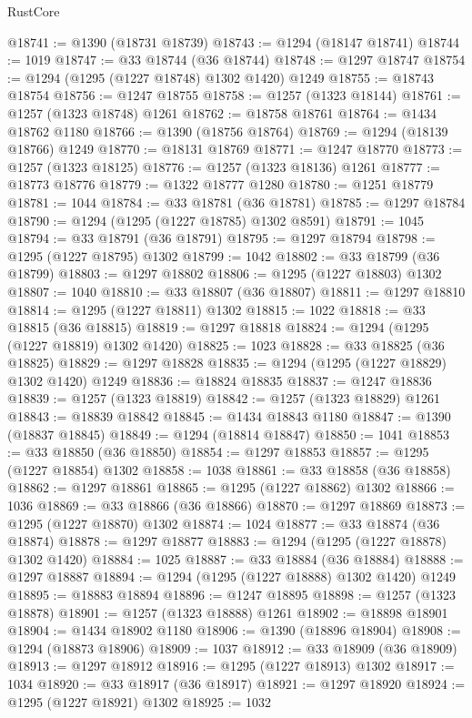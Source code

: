 \begin{lexlean}{RustCore}
\begin{coremodule}
@18741 := @1390 (@18731 @18739)
@18743 := @1294 (@18147 @18741)
@18744 := 1019
@18747 := @33 @18744 (@36 @18744)
@18748 := @1297 @18747
@18754 := @1294 (@1295 (@1227 @18748) @1302 @1420) @1249
@18755 := @18743 @18754
@18756 := @1247 @18755
@18758 := @1257 (@1323 @18144)
@18761 := @1257 (@1323 @18748) @1261
@18762 := @18758 @18761
@18764 := @1434 @18762 @1180
@18766 := @1390 (@18756 @18764)
@18769 := @1294 (@18139 @18766) @1249
@18770 := @18131 @18769
@18771 := @1247 @18770
@18773 := @1257 (@1323 @18125)
@18776 := @1257 (@1323 @18136) @1261
@18777 := @18773 @18776
@18779 := @1322 @18777 @1280
@18780 := @1251 @18779
@18781 := 1044
@18784 := @33 @18781 (@36 @18781)
@18785 := @1297 @18784
@18790 := @1294 (@1295 (@1227 @18785) @1302 @8591)
@18791 := 1045
@18794 := @33 @18791 (@36 @18791)
@18795 := @1297 @18794
@18798 := @1295 (@1227 @18795) @1302
@18799 := 1042
@18802 := @33 @18799 (@36 @18799)
@18803 := @1297 @18802
@18806 := @1295 (@1227 @18803) @1302
@18807 := 1040
@18810 := @33 @18807 (@36 @18807)
@18811 := @1297 @18810
@18814 := @1295 (@1227 @18811) @1302
@18815 := 1022
@18818 := @33 @18815 (@36 @18815)
@18819 := @1297 @18818
@18824 := @1294 (@1295 (@1227 @18819) @1302 @1420)
@18825 := 1023
@18828 := @33 @18825 (@36 @18825)
@18829 := @1297 @18828
@18835 := @1294 (@1295 (@1227 @18829) @1302 @1420) @1249
@18836 := @18824 @18835
@18837 := @1247 @18836
@18839 := @1257 (@1323 @18819)
@18842 := @1257 (@1323 @18829) @1261
@18843 := @18839 @18842
@18845 := @1434 @18843 @1180
@18847 := @1390 (@18837 @18845)
@18849 := @1294 (@18814 @18847)
@18850 := 1041
@18853 := @33 @18850 (@36 @18850)
@18854 := @1297 @18853
@18857 := @1295 (@1227 @18854) @1302
@18858 := 1038
@18861 := @33 @18858 (@36 @18858)
@18862 := @1297 @18861
@18865 := @1295 (@1227 @18862) @1302
@18866 := 1036
@18869 := @33 @18866 (@36 @18866)
@18870 := @1297 @18869
@18873 := @1295 (@1227 @18870) @1302
@18874 := 1024
@18877 := @33 @18874 (@36 @18874)
@18878 := @1297 @18877
@18883 := @1294 (@1295 (@1227 @18878) @1302 @1420)
@18884 := 1025
@18887 := @33 @18884 (@36 @18884)
@18888 := @1297 @18887
@18894 := @1294 (@1295 (@1227 @18888) @1302 @1420) @1249
@18895 := @18883 @18894
@18896 := @1247 @18895
@18898 := @1257 (@1323 @18878)
@18901 := @1257 (@1323 @18888) @1261
@18902 := @18898 @18901
@18904 := @1434 @18902 @1180
@18906 := @1390 (@18896 @18904)
@18908 := @1294 (@18873 @18906)
@18909 := 1037
@18912 := @33 @18909 (@36 @18909)
@18913 := @1297 @18912
@18916 := @1295 (@1227 @18913) @1302
@18917 := 1034
@18920 := @33 @18917 (@36 @18917)
@18921 := @1297 @18920
@18924 := @1295 (@1227 @18921) @1302
@18925 := 1032

\end{coremodule}
\end{lexlean}
